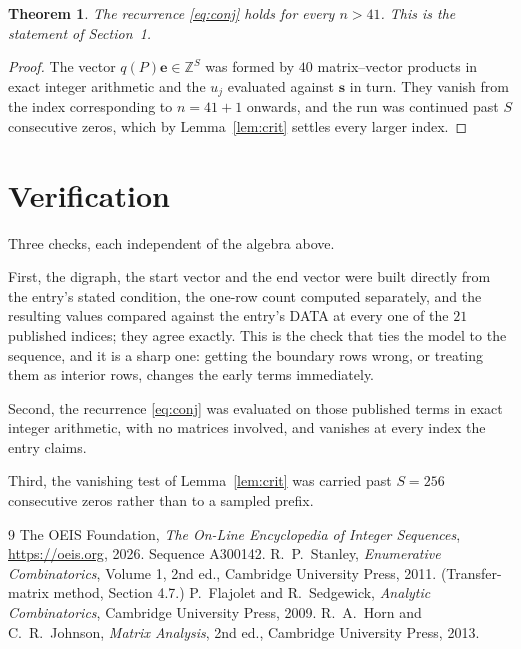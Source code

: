 \documentclass[11pt,a4paper]{article}
\theoremstyle{plain}
\newtheorem{theorem}{Theorem}
\theoremstyle{definition}
\begin{document}
\begin{theorem}
The recurrence \eqref{eq:conj} holds for every $n>41$. This is the statement of
Section~1.
\end{theorem}

\begin{proof}
The vector $q(P)\mathbf{e}\in\mathbb{Z}^{S}$ was formed by $40$ matrix--vector
products in exact integer arithmetic and the $u_j$ evaluated against $\mathbf{s}$ in turn.
They vanish from the index corresponding to $n=41+1$ onwards, and the run was continued
past $S$ consecutive zeros, which by Lemma~\ref{lem:crit} settles every larger index.
\end{proof}

\section{Verification}

Three checks, each independent of the algebra above.

First, the digraph, the start vector and the end vector were built directly from the
entry's stated condition, the one-row count computed separately, and the resulting values
compared against the entry's DATA at every one of the $21$ published indices; they
agree exactly. This is the check that ties the model to the sequence, and it is a sharp one:
getting the boundary rows wrong, or treating them as interior rows, changes the early terms
immediately.

Second, the recurrence \eqref{eq:conj} was evaluated on those published terms in exact
integer arithmetic, with no matrices involved, and vanishes at every index the entry claims.

Third, the vanishing test of Lemma~\ref{lem:crit} was carried past $S=256$ consecutive
zeros rather than to a sampled prefix.

\begin{thebibliography}{9}
 The OEIS Foundation, \emph{The On-Line Encyclopedia of Integer
Sequences}, \url{https://oeis.org}, 2026. Sequence A300142.
 R.~P.~Stanley, \emph{Enumerative Combinatorics}, Volume 1, 2nd ed.,
Cambridge University Press, 2011. (Transfer-matrix method, Section 4.7.)
 P.~Flajolet and R.~Sedgewick, \emph{Analytic Combinatorics}, Cambridge
University Press, 2009.
 R.~A.~Horn and C.~R.~Johnson, \emph{Matrix Analysis}, 2nd ed., Cambridge
University Press, 2013.
\end{thebibliography}
\end{document}

